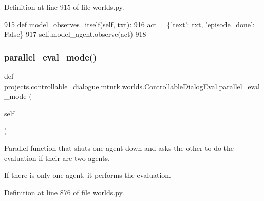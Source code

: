 Definition at line 915 of file worlds.\+py.


\begin{DoxyCode}
915     \textcolor{keyword}{def }model\_observes\_itself(self, txt):
916         act = \{\textcolor{stringliteral}{'text'}: txt, \textcolor{stringliteral}{'episode\_done'}: \textcolor{keyword}{False}\}
917         self.model\_agent.observe(act)
918 
\end{DoxyCode}
\mbox{\label{classprojects_1_1controllable__dialogue_1_1mturk_1_1worlds_1_1ControllableDialogEval_ac7bd664aea619365216c1c268290b728}} 
\subsubsection{\texorpdfstring{parallel\+\_\+eval\+\_\+mode()}{parallel\_eval\_mode()}}
{\footnotesize\ttfamily def projects.\+controllable\+\_\+dialogue.\+mturk.\+worlds.\+Controllable\+Dialog\+Eval.\+parallel\+\_\+eval\+\_\+mode (\begin{DoxyParamCaption}\item[{}]{self }\end{DoxyParamCaption})}

\begin{DoxyVerb}Parallel function that shuts one agent down and asks the other to do the
evaluation if their are two agents.

If there is only one agent, it performs the evaluation.
\end{DoxyVerb}
 

Definition at line 876 of file worlds.\+py.



